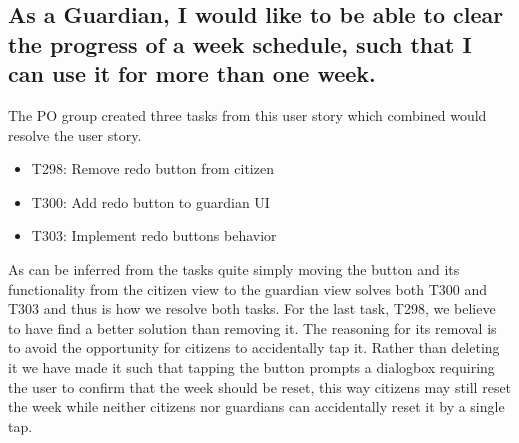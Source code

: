 \subsection{As a Guardian, I would like to be able to clear the progress of a week schedule, such
that I can use it for more than one week.}
The PO group created three tasks from this user story which combined would resolve the user story.
\begin{itemize}
    \item T298: Remove redo button from citizen
    \item T300: Add redo button to guardian UI
    \item T303: Implement redo buttons behavior
\end{itemize}
As can be inferred from the tasks quite simply moving the button and its functionality from the citizen view to the guardian view solves both T300 and T303 and thus is how we resolve both tasks.
For the last task, T298, we believe to have find a better solution than removing it.
The reasoning for its removal is to avoid the opportunity for citizens to accidentally tap it.
Rather than deleting it we have made it such that tapping the button prompts a dialogbox requiring the user to confirm that the week should be reset, this way citizens may still reset the week while neither citizens nor guardians can accidentally reset it by a single tap.